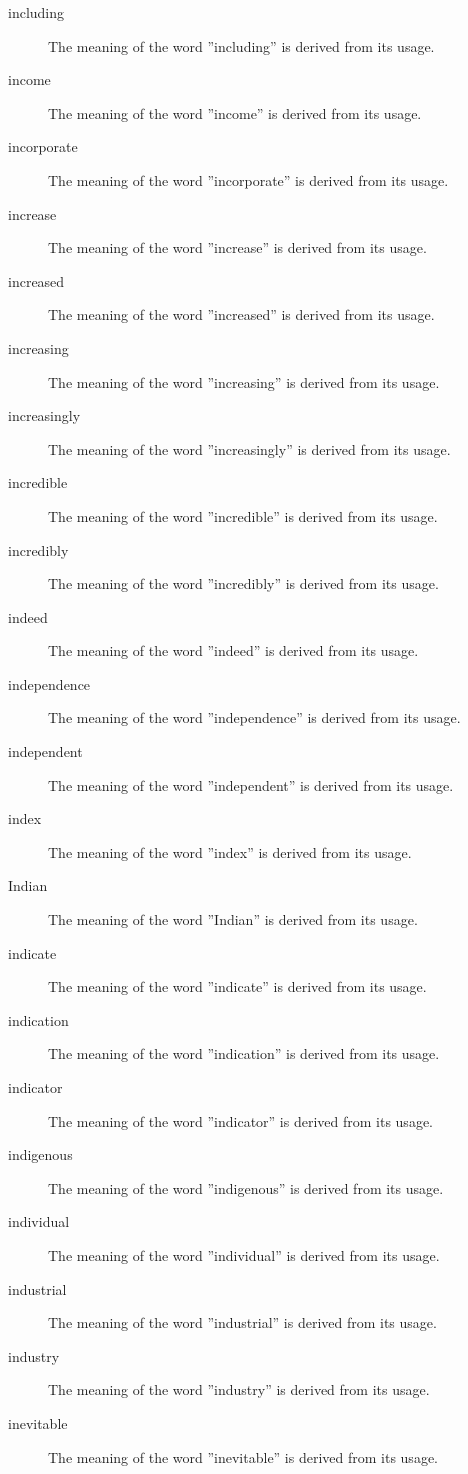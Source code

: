 \documentclass[12pt, letterpaper]{memoir}
\begin{document}
\begin{description}
\item[including] The meaning of the word ''including'' is derived from its usage.
\item[income] The meaning of the word ''income'' is derived from its usage.
\item[incorporate] The meaning of the word ''incorporate'' is derived from its usage.
\item[increase] The meaning of the word ''increase'' is derived from its usage.
\item[increased] The meaning of the word ''increased'' is derived from its usage.
\item[increasing] The meaning of the word ''increasing'' is derived from its usage.
\item[increasingly] The meaning of the word ''increasingly'' is derived from its usage.
\item[incredible] The meaning of the word ''incredible'' is derived from its usage.
\item[incredibly] The meaning of the word ''incredibly'' is derived from its usage.
\item[indeed] The meaning of the word ''indeed'' is derived from its usage.
\item[independence] The meaning of the word ''independence'' is derived from its usage.
\item[independent] The meaning of the word ''independent'' is derived from its usage.
\item[index] The meaning of the word ''index'' is derived from its usage.
\item[Indian] The meaning of the word ''Indian'' is derived from its usage.
\item[indicate] The meaning of the word ''indicate'' is derived from its usage.
\item[indication] The meaning of the word ''indication'' is derived from its usage.
\item[indicator] The meaning of the word ''indicator'' is derived from its usage.
\item[indigenous] The meaning of the word ''indigenous'' is derived from its usage.
\item[individual] The meaning of the word ''individual'' is derived from its usage.
\item[industrial] The meaning of the word ''industrial'' is derived from its usage.
\item[industry] The meaning of the word ''industry'' is derived from its usage.
\item[inevitable] The meaning of the word ''inevitable'' is derived from its usage.

\end{description}
\end{document}
